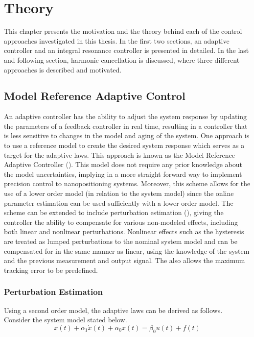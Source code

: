 \chapter{Theory}\label{cha:controlApproach}
This chapter presents the motivation and the theory behind each of the control approaches investigated in this thesis. In the first two sections, an adaptive controller and an integral resonance controller is presented in detailed. In the last and following section, harmonic cancellation is discussed, where three different approaches is described and motivated.

\section{Model Reference Adaptive Control}
An adaptive controller has the ability to adjust the system response by updating the parameters of a feedback controller in real time, resulting in a controller that is less sensitive to changes in the model and aging of the system. One approach is to use a reference model to create the desired system response which serves as a target for the adaptive laws. This approach is known as the Model Reference Adaptive Controller (\abbrMRAC). This model does not require any prior knowledge about the model uncertainties, implying in a more straight forward way to implement precision control to nanopositioning systems. Moreover, this scheme allows for the use of a lower order model (in relation to the system model) since the online parameter estimation can be used sufficiently with a lower order model. The \abbrMRAC scheme can be extended to include perturbation estimation (\abbrMRACPE), giving the controller the ability to compensate for various non-modeled effects, including both linear and nonlinear perturbations. Nonlinear effects such as the hysteresis are treated as lumped perturbations to the nominal system model and can be compensated for in the same manner as linear, using the knowledge of the system and the previous measurement and output signal. The \abbrMRACPE also allows the maximum tracking error to be predefined.

\subsection{Perturbation Estimation}\label{sec:pertest}
Using a second order model, the adaptive laws can be derived as follows. Consider the system model stated below.
\begin{equation}
  \label{eq:sysmodel}
  \ddot{x}(t) + \alpha_1\dot{x}(t) +  \alpha_0x(t) = \beta_0u(t) + f(t)
\end{equation}

